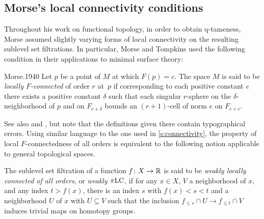 \subsection{Morse's local connectivity conditions}\label{subsec:historic_hlc}




Throughout his work on functional topology, in order to obtain \mbox{q-tameness}, Morse assumed slightly varying forms of local connectivity on the resulting sublevel set filtrations.
In particular, Morse and Tompkins used the following condition in their applications to minimal surface theory:
\begin{displaycquote}[p.~431]{Morse.1940}
	Let $p$ be a point of $M$ at which $F(p)=c$.
	The space $M$ is said to be \emph{locally $F$-connected} of order $r$ at~$p$ if corresponding to each positive constant $e$ there exists a positive constant $\delta$ such that each singular $r$-sphere on the $\delta$-neighborhood of $p$ and on $F_{c+\delta}$ bounds an $(r+1)$-cell of norm $e$ on $F_{c+e}$.
\end{displaycquote}
See also \cite[p.~ 25]{Morse.1938} and \cite[p.~464]{Morse.1939}, but note that the definitions given there contain typographical errors.
Using similar language to the one used in \cref{s:connectivity}, the property of local $F$-connectedness of all orders is equivalent to the following notion applicable to general topological spaces.

\begin{defi}
	The sublevel set filtration of a function $f \colon X \to \mathbb{R}$ is said to be \emph{weakly locally connected of all orders}, or \emph{weakly $\pi\mathrm{LC}$}, if for any $x \in X$, $V$ a neighborhood of $x$, and any index $t > f(x)$, there is an index $s$ with $f(x) < s < t$ and a neighborhood $U$ of $x$ with $U \subseteq V$ such that the inclusion $f_{\leq s} \cap U \to f_{\leq t} \cap V$ induces trivial maps on homotopy groups.
\end{defi}

